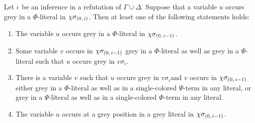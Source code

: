 \documentclass[,%
	draft=false,%
	numbers=noendperiod
	12pt,
	a4paper,
	oneside,%
	openany,
]{memoir}
\newcommand{\inv}{\ensuremath{\chi}}
\begin{document}
\begin{lemma}
	\label{lemma:var_grey_col_lit}
	Let $\iota$ be an inference in a refutation of $\Gamma\cup\Delta$.
	Suppose that a variable $u$ occurs grey in a $\Phi$-literal in $\inv\sigmazi$.
	Then at least one of the following statements holds:
	\begin{enumerate}
		\item
			\label{14_1}
			The variable $u$ occurs grey in a $\Phi$-literal in $\inv\sigmazmi$.

		\item 
			\label{14_2}
			Some variable $v$ occurs in $\inv\sigmazmi$ grey in a $\Phi$-literal as well as grey in a $\Psi$-literal such that $u$ occurs grey in $v\sigma_i$.

		\item 
			\label{14_3}
			There is a variable $v$ such that $u$ occurs grey in $v\sigma_i$\footnotemark and $v$ occurs in $\inv\sigmazmi$
			either grey in a $\Phi$-literal as well as in a single-colored $\Psi$-term in any literal, 
			or grey in a $\Psi$-literal as well as in a single-colored $\Phi$-term in any literal.

		\item
			\label{14_4}
			The variable $u$ occurs at a grey position in a grey literal in $\inv\sigmazmi$.

	\end{enumerate}
\end{lemma}
\end{document}
